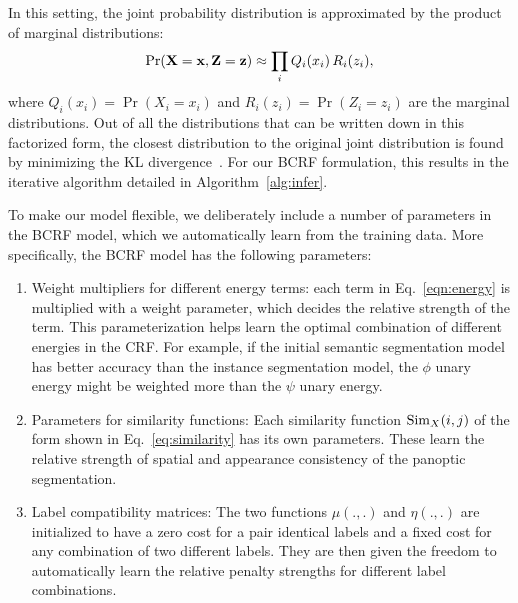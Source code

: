 In this setting, the joint probability distribution is approximated by the product of marginal distributions:
\begin{equation}
\label{eq:q_approx}
\Pr(\mathbf{X}=\mathbf{x}, \mathbf{Z}=\mathbf{z}) \approx \prod_i Q_i(x_i)\,R_i(z_i),
\end{equation}
where $Q_i(x_i) = \Pr(X_i = x_i)$ and $R_i(z_i) = \Pr(Z_i = z_i)$ are the marginal distributions. Out of all the distributions that can be written down in this factorized form, the closest distribution to the original joint distribution is found by minimizing the KL divergence~\cite{Koller_book, densecrf}. For our BCRF formulation, this results in the iterative algorithm detailed in Algorithm~\ref{alg:infer}.

To make our model flexible, we deliberately include a number of parameters in the BCRF model, which we automatically learn from the training data. More specifically, the BCRF model has the following parameters:
\begin{enumerate}
	\item Weight multipliers for different energy terms: each term in Eq.~\eqref{eqn:energy} is multiplied with a weight parameter, which decides the relative strength of the term. This parameterization helps learn the optimal combination of different energies in the CRF. For example, if the initial semantic segmentation model has better accuracy than the instance segmentation model, the $\phi$ unary energy might be weighted more than the $\psi$ unary energy.
	
	\item Parameters for similarity functions: Each similarity function $\operatorname{Sim}_X(i, j)$ of the form shown in Eq.~\eqref{eq:similarity} has its own parameters. These learn the relative strength of spatial and appearance consistency of the panoptic segmentation.
	
	\item Label compatibility matrices: The two functions $\mu(., .)$ and $\eta(., .)$ are initialized to have a zero cost for a pair identical labels and a fixed cost for any combination of two different labels. They are then given the freedom to automatically learn the relative penalty strengths for different label combinations.
\end{enumerate}



